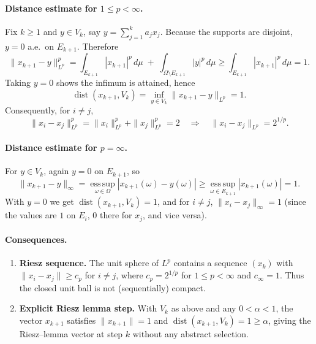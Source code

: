 \documentclass[12pt,a4paper]{article}
\theoremstyle{plain}
\theoremstyle{definition}
\theoremstyle{remark}
\theoremstyle{remark}
\theoremstyle{definition}
\begin{document}
	\bigskip
	
	\paragraph{Distance estimate for $1\le p<\infty$.}
	Fix $k\ge1$ and $y\in V_k$, say $y=\sum_{j=1}^k a_j x_j$.
	Because the supports are disjoint, $y=0$ a.e.\ on $E_{k+1}$.
	Therefore
	\[
	\|x_{k+1}-y\|_{L^p}^p
	= \int_{E_{k+1}} |x_{k+1}|^p\,d\mu \;+\; \int_{\Omega\setminus E_{k+1}} |y|^p\,d\mu
	\ge \int_{E_{k+1}} |x_{k+1}|^p\,d\mu
	= 1.
	\]
	Taking $y=0$ shows the infimum is attained, hence
	\[
	\operatorname{dist}(x_{k+1},V_k)=\inf_{y\in V_k}\|x_{k+1}-y\|_{L^p}=1.
	\]
	Consequently, for $i\neq j$,
	\[
	\|x_i-x_j\|_{L^p}^p
	= \|x_i\|_{L^p}^p + \|x_j\|_{L^p}^p
	= 2 \quad\Longrightarrow\quad \|x_i-x_j\|_{L^p}=2^{1/p}.
	\]
	
	\bigskip
	
	\paragraph{Distance estimate for $p=\infty$.}
	For $y\in V_k$, again $y=0$ on $E_{k+1}$, so
	\[
	\|x_{k+1}-y\|_\infty
	= \operatorname*{ess\,sup}_{\omega\in\Omega} |x_{k+1}(\omega)-y(\omega)|
	\ge \operatorname*{ess\,sup}_{\omega\in E_{k+1}} |x_{k+1}(\omega)|
	= 1.
	\]
	With $y=0$ we get $\operatorname{dist}(x_{k+1},V_k)=1$, and for $i\neq j$,
	$\|x_i-x_j\|_\infty=1$ (since the values are $1$ on $E_i$, $0$ there for $x_j$, and vice versa).
	
	\bigskip
	
	\paragraph{Consequences.}
	\begin{enumerate}
		\item \textbf{Riesz sequence.} The unit sphere of $L^p$ contains a sequence $(x_k)$ with
		$\|x_i-x_j\|\ge c_p$ for $i\ne j$, where $c_p=2^{1/p}$ for $1\le p<\infty$ and $c_\infty=1$.
		Thus the closed unit ball is not (sequentially) compact.
		\item \textbf{Explicit Riesz lemma step.} With $V_k$ as above and any $0<\alpha<1$,
		the vector $x_{k+1}$ satisfies $\|x_{k+1}\|=1$ and $\operatorname{dist}(x_{k+1},V_k)=1\ge\alpha$,
		giving the Riesz–lemma vector at step $k$ without any abstract selection.
	\end{enumerate}
	
	\bigskip
	
\end{document}
